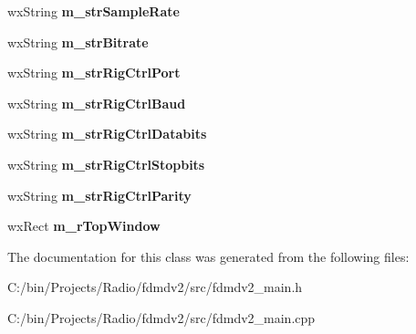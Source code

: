 \begin{DoxyCompactItemize}
\item 
\hypertarget{class_main_app_acd7dcb55a60f5b3a343238fdd60b748f}{wx\-String {\bfseries m\-\_\-str\-Sample\-Rate}}\label{class_main_app_acd7dcb55a60f5b3a343238fdd60b748f}

\item 
\hypertarget{class_main_app_a984c580c1f2831348b857777bd800585}{wx\-String {\bfseries m\-\_\-str\-Bitrate}}\label{class_main_app_a984c580c1f2831348b857777bd800585}

\item 
\hypertarget{class_main_app_ab191e22c827be40319221b07b0afc91e}{wx\-String {\bfseries m\-\_\-str\-Rig\-Ctrl\-Port}}\label{class_main_app_ab191e22c827be40319221b07b0afc91e}

\item 
\hypertarget{class_main_app_af367d4403e54c973f3b5d9708ac42318}{wx\-String {\bfseries m\-\_\-str\-Rig\-Ctrl\-Baud}}\label{class_main_app_af367d4403e54c973f3b5d9708ac42318}

\item 
\hypertarget{class_main_app_a5ee4f9e7aed236fdf885442d5accf37f}{wx\-String {\bfseries m\-\_\-str\-Rig\-Ctrl\-Databits}}\label{class_main_app_a5ee4f9e7aed236fdf885442d5accf37f}

\item 
\hypertarget{class_main_app_ab9b597849713a2a3a18782243c2cbf89}{wx\-String {\bfseries m\-\_\-str\-Rig\-Ctrl\-Stopbits}}\label{class_main_app_ab9b597849713a2a3a18782243c2cbf89}

\item 
\hypertarget{class_main_app_ab61a6ceb5655721d22b71a28fbe4aab2}{wx\-String {\bfseries m\-\_\-str\-Rig\-Ctrl\-Parity}}\label{class_main_app_ab61a6ceb5655721d22b71a28fbe4aab2}

\item 
\hypertarget{class_main_app_aef360a075faca729e3ad9d352b778478}{wx\-Rect {\bfseries m\-\_\-r\-Top\-Window}}\label{class_main_app_aef360a075faca729e3ad9d352b778478}

\end{DoxyCompactItemize}


The documentation for this class was generated from the following files\-:\begin{DoxyCompactItemize}
\item 
C\-:/bin/\-Projects/\-Radio/fdmdv2/src/fdmdv2\-\_\-main.\-h\item 
C\-:/bin/\-Projects/\-Radio/fdmdv2/src/fdmdv2\-\_\-main.\-cpp\end{DoxyCompactItemize}
